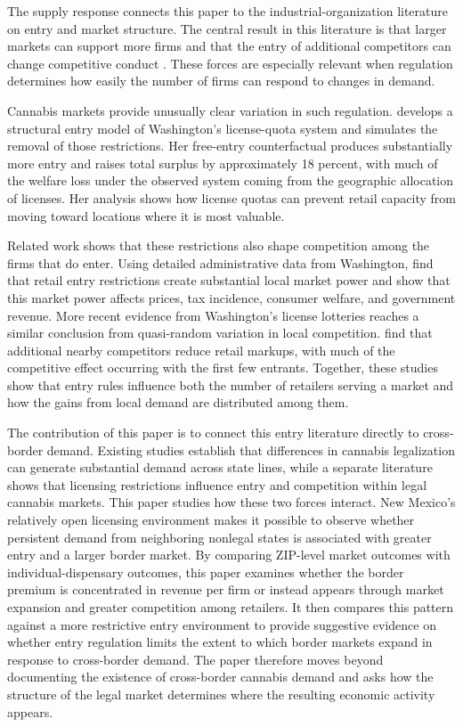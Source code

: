 \documentclass[english,12pt]{article}
\begin{document}
The supply response connects this paper to the industrial-organization literature on entry and market structure. The central result in this literature is that larger markets can support more firms and that the entry of additional competitors can change competitive conduct \cite{BresnahanReiss1991, BerryReiss2007}. These forces are especially relevant when regulation determines how easily the number of firms can respond to changes in demand.

Cannabis markets provide unusually clear variation in such regulation. \cite{thomas2019license} develops a structural entry model of Washington's license-quota system and simulates the removal of those restrictions. Her free-entry counterfactual produces substantially more entry and raises total surplus by approximately 18 percent, with much of the welfare loss under the observed system coming from the geographic allocation of licenses. Her analysis shows how license quotas can prevent retail capacity from moving toward locations where it is most valuable.

Related work shows that these restrictions also shape competition among the firms that do enter. Using detailed administrative data from Washington, \cite{HollenbeckUetake2021} find that retail entry restrictions create substantial local market power and show that this market power affects prices, tax incidence, consumer welfare, and government revenue. More recent evidence from Washington's license lotteries reaches a similar conclusion from quasi-random variation in local competition. \cite{HollenbeckHristakevaUetake2026} find that additional nearby competitors reduce retail markups, with much of the competitive effect occurring with the first few entrants. Together, these studies show that entry rules influence both the number of retailers serving a market and how the gains from local demand are distributed among them.

The contribution of this paper is to connect this entry literature directly to cross-border demand. Existing studies establish that differences in cannabis legalization can generate substantial demand across state lines, while a separate literature shows that licensing restrictions influence entry and competition within legal cannabis markets. This paper studies how these two forces interact. New Mexico's relatively open licensing environment makes it possible to observe whether persistent demand from neighboring nonlegal states is associated with greater entry and a larger border market. By comparing ZIP-level market outcomes with individual-dispensary outcomes, this paper examines whether the border premium is concentrated in revenue per firm or instead appears through market expansion and greater competition among retailers. It then compares this pattern against a more restrictive entry environment to provide suggestive evidence on whether entry regulation limits the extent to which border markets expand in response to cross-border demand. The paper therefore moves beyond documenting the existence of cross-border cannabis demand and asks how the structure of the legal market determines where the resulting economic activity appears.
\end{document}
